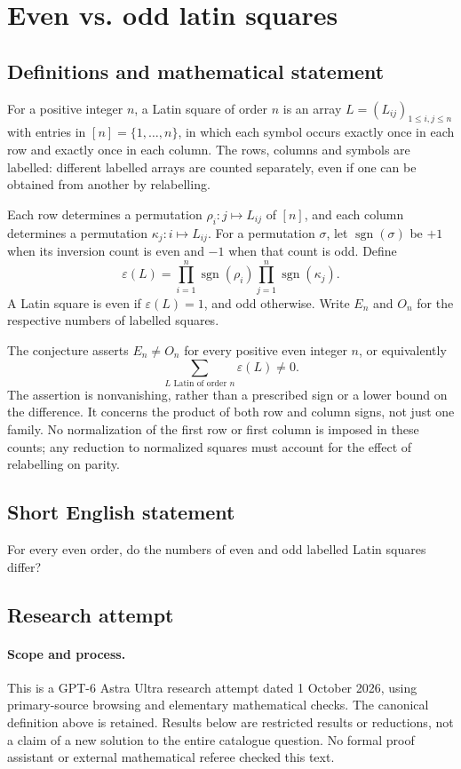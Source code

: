 \documentclass[11pt,a4paper]{article}
\begin{document}
\section*{Even vs. odd latin squares}\label{statement}

\subsection{Definitions and mathematical statement}
For a positive integer $n$, a Latin square of order $n$ is an array
$L=(L_{ij})_{1\le i,j\le n}$ with entries in $[n]=\{1,\ldots,n\}$, in which
each symbol occurs exactly once in each row and exactly once in each column.
The rows, columns and symbols are labelled: different labelled arrays are
counted separately, even if one can be obtained from another by relabelling.

Each row determines a permutation $\rho_i:j\mapsto L_{ij}$ of $[n]$, and
each column determines a permutation $\kappa_j:i\mapsto L_{ij}$.
For a permutation $\sigma$, let $\operatorname{sgn}(\sigma)$ be $+1$ when
its inversion count is even and $-1$ when that count is odd. Define
\[
 \varepsilon(L)=\prod_{i=1}^n\operatorname{sgn}(\rho_i)
                 \prod_{j=1}^n\operatorname{sgn}(\kappa_j).
\]
A Latin square is even if $\varepsilon(L)=1$, and odd otherwise. Write
$E_n$ and $O_n$ for the respective numbers of labelled squares.

The conjecture asserts $E_n\ne O_n$ for every positive even integer $n$,
or equivalently
\[
 \sum_{L\text{ Latin of order }n}\varepsilon(L)\ne0.
\]
The assertion is nonvanishing, rather than a prescribed sign or a lower
bound on the difference. It concerns the product of both row and column
signs, not just one family. No normalization of the first row or first
column is imposed in these counts; any reduction to normalized squares
must account for the effect of relabelling on parity.
\subsection{Short English statement}
For every even order, do the numbers of even and odd labelled Latin squares differ?
\subsection{Research attempt}
\paragraph{Scope and process.}
This is a GPT-6 Astra Ultra research attempt dated 1 October 2026, using
primary-source browsing and elementary mathematical checks. The canonical
definition above is retained. Results below are restricted results or
reductions, not a claim of a new solution to the entire catalogue question.
No formal proof assistant or external mathematical referee checked this text.
\end{document}
